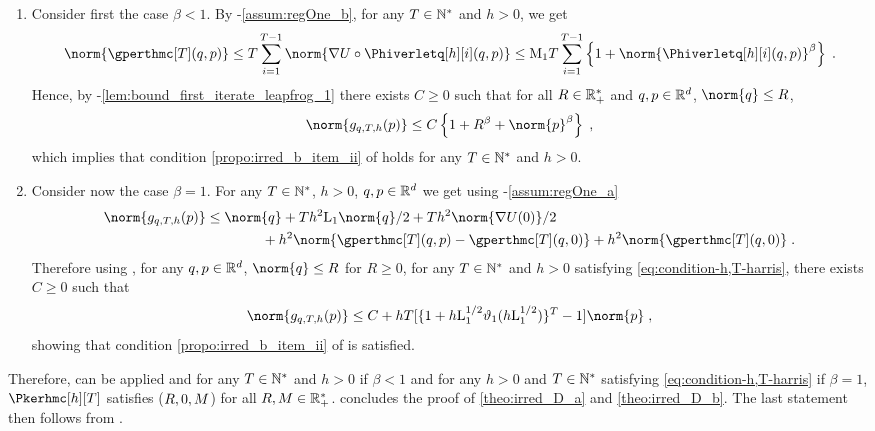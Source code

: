 \begin{enumerate}[label=$\bullet$, wide, labelwidth=!, labelindent=0pt]
\item Consider first the case $\beta <1$. By -\ref{assum:regOne_b},
for any $T \in \mathbb{N}^{*}$ and $h >0$, we get
\begin{equation}
\norm{\gperthmc[T](\q,\p)} \leq  T \sum_{i=1}^{T-1} \norm{\nabla \F \circ \Phiverletq[h][i](\q,\p)} \leq
\constzeroT T \sum_{i=1}^{T-1} \defEns{ 1 + \norm{\Phiverletq[h][i](\q,\p)}^{\expozero}}
 \eqsp.
\end{equation}
Hence, by -\ref{lem:bound_first_iterate_leapfrog_1}
there exists $C \geq 0$ such that for all $R\in \mathbb{R}_+^*$ and
$q,p \in \mathbb{R}^d$, $\norm{q} \leq R$,
\begin{equation}
\label{eq:3:theo:irred_D}
\norm{g_{q,T,h}(p)} \leq C \defEns{1+R^{\beta} +\norm{p}^{\expozero}} \eqsp,
\end{equation}
which implies that condition \ref{propo:irred_b_item_ii} of  holds for any $T \in \mathbb{N}^{*}$ and $h >0$.

\item Consider now the case $\beta =1$.  For any $T \in \mathbb{N}^{*}$, $h >0$,  $q,p \in \mathbb{R}^d$ we get using -\ref{assum:regOne_a}
\begin{align}
  \norm{g_{q,T,h}(p)} &\leq \norm{q} + Th^2 \constzero  \norm{q} /2 + Th^2 \norm{\nabla U(0)} /2\\
  & \qquad \qquad +h^2 \norm{\gperthmc[T](q,p) - \gperthmc[T](q,0)} + h^2 \norm{ \gperthmc[T](q,0)} \eqsp.
\end{align}
Therefore using , for any $q,p \in \mathbb{R}^d$, $\norm{q} \leq R$ for $R \geq 0$, for any $T \in \mathbb{N}^{*}$ and $h >0$ satisfying \eqref{eq:condition-h,T-harris}, there exists $C \geq 0$ such that
\begin{equation}
  \norm{g_{q,T,h}(p)} \leq C + h T  [ \{1+ h \constzero^{1/2} \vartheta_1(h\constzero^{1/2})\}^T-1]  \norm{p} \eqsp,
\end{equation}
showing that condition \ref{propo:irred_b_item_ii} of  is satisfied.
\end{enumerate}

Therefore,   can be applied and for any $T \in \mathbb{N}^{*}$ and $h >0$ if $\beta <1$ and for any $h > 0$ and $T \in \mathbb{N}^{*}$ satisfying \eqref{eq:condition-h,T-harris} if $\beta =1$, $\Pkerhmc[h][T]$ satisfies ($R,0,M$) for all $R,M \in
\mathbb{R}_+^*$.   concludes the proof of \ref{theo:irred_D_a} and \ref{theo:irred_D_b}.
The last statement then follows from   \cite[Theorem 14.0.1]{meyn:tweedie:2009}.


